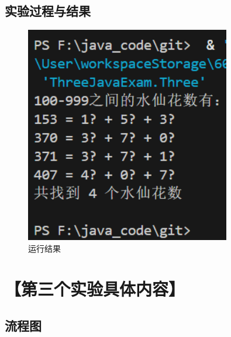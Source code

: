\documentclass[12pt,a4paper]{article}
\begin{document}
\subsection*{实验过程与结果}

\begin{figure}[H]
\centering
\includegraphics[width=0.8\textwidth]{three.png}
\caption{运行结果}
\end{figure}

\section*{【第三个实验具体内容】}

\subsection*{流程图}
\end{document}
